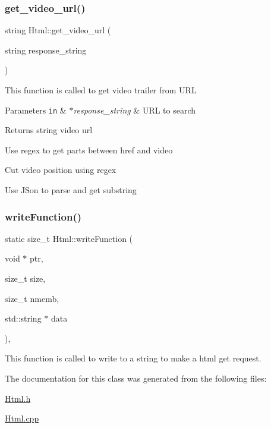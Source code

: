 \subsubsection{\texorpdfstring{get\+\_\+video\+\_\+url()}{get\_video\_url()}}
{\footnotesize\ttfamily string Html\+::get\+\_\+video\+\_\+url (\begin{DoxyParamCaption}\item[{string}]{response\+\_\+string }\end{DoxyParamCaption})}

This function is called to get video trailer from U\+RL 
\begin{DoxyParams}[1]{Parameters}
\mbox{\tt in}  & {\em $\ast$response\+\_\+string} & U\+RL to search \\
\hline
\end{DoxyParams}
\begin{DoxyReturn}{Returns}
string video url 
\end{DoxyReturn}
Use regex to get parts between href and video

Cut video position using regex

Use J\+Son to parse and get substring\mbox{\label{classHtml_a08bdc1d0e3fc60c4d12304e0dad1c302}} 
\subsubsection{\texorpdfstring{write\+Function()}{writeFunction()}}
{\footnotesize\ttfamily static size\+\_\+t Html\+::write\+Function (\begin{DoxyParamCaption}\item[{void $\ast$}]{ptr,  }\item[{size\+\_\+t}]{size,  }\item[{size\+\_\+t}]{nmemb,  }\item[{std\+::string $\ast$}]{data }\end{DoxyParamCaption})\hspace{0.3cm}{\ttfamily [inline]}, {\ttfamily [static]}}

This function is called to write to a string to make a html get request. 

The documentation for this class was generated from the following files\+:\begin{DoxyCompactItemize}
\item 
\hyperlink{Html_8h}{Html.\+h}\item 
\hyperlink{Html_8cpp}{Html.\+cpp}\end{DoxyCompactItemize}
